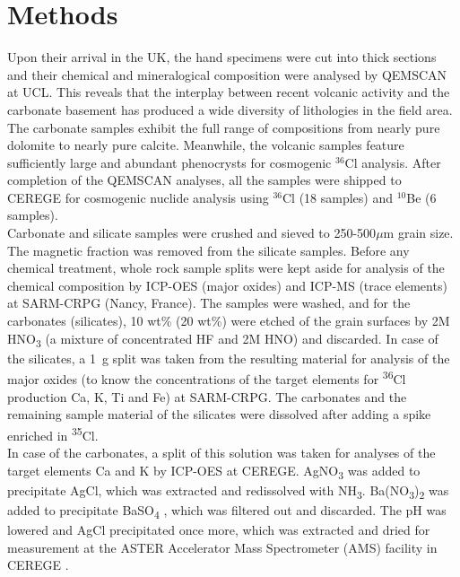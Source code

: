 \documentclass[titlepage]{article}
\begin{document}
\section{Methods}
\label{sec:methods}

Upon their arrival in the UK, the hand specimens were cut into thick
sections and their chemical and mineralogical composition were
analysed by QEMSCAN \citep[Quantitative Evaluation of Minerals by
  SCANning electron microscopy,][]{allen2012} at UCL. This reveals
that the interplay between recent volcanic activity and the carbonate
basement has produced a wide diversity of lithologies in the field
area. The carbonate samples exhibit the full range of compositions
from nearly pure dolomite to nearly pure calcite. Meanwhile, the
volcanic samples feature sufficiently large and abundant phenocrysts
for cosmogenic $^{36}$Cl analysis.  After completion of the QEMSCAN
analyses, all the samples were shipped to CEREGE for cosmogenic
nuclide analysis using $^{36}$Cl (18 samples) and $^{10}$Be (6
samples).\\

Carbonate and silicate samples were crushed and sieved to
250-500$\mu$m grain size. The magnetic fraction was removed from the
silicate samples. Before any chemical treatment, whole rock sample
splits were kept aside for analysis of the chemical composition by
ICP-OES (major oxides) and ICP-MS (trace elements) at SARM-CRPG
(Nancy, France). The samples were washed, and for the carbonates
(silicates), 10 wt\% (20 wt\%) were etched of the grain surfaces by 2M
HNO\textsubscript{3} (a mixture of concentrated HF and 2M HNO) and
discarded. In case of the silicates, a 1~g split was taken from the
resulting material for analysis of the major oxides (to know the
concentrations of the target elements for \textsuperscript{36}Cl
production Ca, K, Ti and Fe) at SARM-CRPG.  The carbonates and the
remaining sample material of the silicates were dissolved after adding
a spike enriched in \textsuperscript{35}Cl.\\

In case of the carbonates, a split of this solution was taken for
analyses of the target elements Ca and K by ICP-OES at CEREGE.
AgNO\textsubscript{3} was added to precipitate AgCl, which was
extracted and redissolved with
NH\textsubscript{3}. Ba(NO\textsubscript{3})\textsubscript{2} was
added to precipitate BaSO\textsubscript{4} , which was filtered out
and discarded. The pH was lowered and AgCl precipitated once more,
which was extracted and dried for measurement at the ASTER Accelerator
Mass Spectrometer (AMS) facility in CEREGE \citep{arnold2013}.\\
\end{document}
